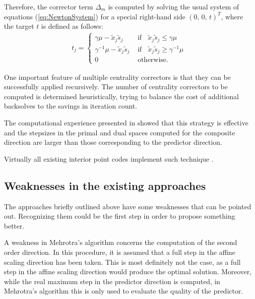 Therefore, the corrector term $\Delta_m$ is computed by solving the usual 
system of equations (\ref{eq:NewtonSystem}) for a special right-hand side
$(0, \,0,\, t)^T$, where the target $t$ is defined as follows:
%
\begin{eqnarray} \label{eq:Target}
  t_j = \left\{
  \begin{array}{ll}
    \gamma \mu - \tilde x_j \tilde s_j  
    & \mbox{ if } \;\; \tilde x_j \tilde s_j \leq \gamma \mu  \\
    \gamma^{-1} \mu - \tilde x_j \tilde s_j  
    & \mbox{ if } \;\; \tilde x_j \tilde s_j \geq \gamma^{-1} \mu  \\
    0    
    & \mbox{ otherwise.}
  \end{array}
  \right.
\end{eqnarray}


One important feature of multiple centrality correctors is that they
can be successfully applied recursively. 
The number of centrality correctors to be computed is determined 
heuristically, trying to balance the cost of additional backsolves to 
the savings in iteration count.


The computational experience presented in \cite{Gondzio96} showed 
that this strategy is effective and the stepsizes in the primal and 
dual spaces computed for the composite direction are larger than 
those corresponding to the predictor direction. 

Virtually all existing interior point codes implement such technique 
\cite[Appendix B]{ipm:Wright97}.

%
%
\subsection{Weaknesses in the existing approaches}

The approaches briefly outlined above have some weaknesses that 
can be pointed out. Recognizing them could be the first step in 
order to propose something better.

A weakness in Mehrotra's algorithm concerns the computation of the 
second order direction. In this procedure, it is assumed that a 
full step in the affine scaling direction has been taken. This is 
most definitely not the case, as a full step in the affine scaling 
direction would produce the optimal solution. Moreover, while
the real maximum step in the predictor direction is computed, 
in Mehrotra's algorithm this is only used to evaluate the quality 
of the predictor.

